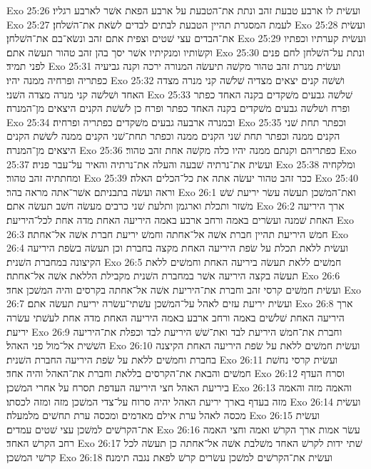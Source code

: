 Exo 25:26  ועשׂית לו ארבע טבעת זהב ונתת את־הטבעת על ארבע הפאת אשׁר לארבע רגליו׃
Exo 25:27  לעמת המסגרת תהיין הטבעת לבתים לבדים לשׂאת את־השׁלחן׃
Exo 25:28  ועשׂית את־הבדים עצי שׁטים וצפית אתם זהב ונשׂא־בם את־השׁלחן׃
Exo 25:29  ועשׂית קערתיו וכפתיו וקשׂותיו ומנקיתיו אשׁר יסך בהן זהב טהור תעשׂה אתם׃
Exo 25:30  ונתת על־השׁלחן לחם פנים לפני תמיד׃
Exo 25:31  ועשׂית מנרת זהב טהור מקשׁה תיעשׂה המנורה ירכה וקנה גביעיה כפתריה ופרחיה ממנה יהיו׃
Exo 25:32  ושׁשׁה קנים יצאים מצדיה שׁלשׁה קני מנרה מצדה האחד ושׁלשׁה קני מנרה מצדה השׁני׃
Exo 25:33  שׁלשׁה גבעים משׁקדים בקנה האחד כפתר ופרח ושׁלשׁה גבעים משׁקדים בקנה האחד כפתר ופרח כן לשׁשׁת הקנים היצאים מן־המנרה׃
Exo 25:34  ובמנרה ארבעה גבעים משׁקדים כפתריה ופרחיה׃
Exo 25:35  וכפתר תחת שׁני הקנים ממנה וכפתר תחת שׁני הקנים ממנה וכפתר תחת־שׁני הקנים ממנה לשׁשׁת הקנים היצאים מן־המנרה׃
Exo 25:36  כפתריהם וקנתם ממנה יהיו כלה מקשׁה אחת זהב טהור׃
Exo 25:37  ועשׂית את־נרתיה שׁבעה והעלה את־נרתיה והאיר על־עבר פניה׃
Exo 25:38  ומלקחיה ומחתתיה זהב טהור׃
Exo 25:39  ככר זהב טהור יעשׂה אתה את כל־הכלים האלה׃
Exo 25:40  וראה ועשׂה בתבניתם אשׁר־אתה מראה בהר׃
Exo 26:1  ואת־המשׁכן תעשׂה עשׂר יריעת שׁשׁ משׁזר ותכלת וארגמן ותלעת שׁני כרבים מעשׂה חשׁב תעשׂה אתם׃
Exo 26:2  ארך היריעה האחת שׁמנה ועשׂרים באמה ורחב ארבע באמה היריעה האחת מדה אחת לכל־היריעת׃
Exo 26:3  חמשׁ היריעת תהיין חברת אשׁה אל־אחתה וחמשׁ יריעת חברת אשׁה אל־אחתה׃
Exo 26:4  ועשׂית ללאת תכלת על שׂפת היריעה האחת מקצה בחברת וכן תעשׂה בשׂפת היריעה הקיצונה במחברת השׁנית׃
Exo 26:5  חמשׁים ללאת תעשׂה ביריעה האחת וחמשׁים ללאת תעשׂה בקצה היריעה אשׁר במחברת השׁנית מקבילת הללאת אשׁה אל־אחתה׃
Exo 26:6  ועשׂית חמשׁים קרסי זהב וחברת את־היריעת אשׁה אל־אחתה בקרסים והיה המשׁכן אחד׃
Exo 26:7  ועשׂית יריעת עזים לאהל על־המשׁכן עשׁתי־עשׂרה יריעת תעשׂה אתם׃
Exo 26:8  ארך היריעה האחת שׁלשׁים באמה ורחב ארבע באמה היריעה האחת מדה אחת לעשׁתי עשׂרה יריעת׃
Exo 26:9  וחברת את־חמשׁ היריעת לבד ואת־שׁשׁ היריעת לבד וכפלת את־היריעה השׁשׁית אל־מול פני האהל׃
Exo 26:10  ועשׂית חמשׁים ללאת על שׂפת היריעה האחת הקיצנה בחברת וחמשׁים ללאת על שׂפת היריעה החברת השׁנית׃
Exo 26:11  ועשׂית קרסי נחשׁת חמשׁים והבאת את־הקרסים בללאת וחברת את־האהל והיה אחד׃
Exo 26:12  וסרח העדף ביריעת האהל חצי היריעה העדפת תסרח על אחרי המשׁכן׃
Exo 26:13  והאמה מזה והאמה מזה בעדף בארך יריעת האהל יהיה סרוח על־צדי המשׁכן מזה ומזה לכסתו׃
Exo 26:14  ועשׂית מכסה לאהל ערת אילם מאדמים ומכסה ערת תחשׁים מלמעלה׃
Exo 26:15  ועשׂית את־הקרשׁים למשׁכן עצי שׁטים עמדים׃
Exo 26:16  עשׂר אמות ארך הקרשׁ ואמה וחצי האמה רחב הקרשׁ האחד׃
Exo 26:17  שׁתי ידות לקרשׁ האחד משׁלבת אשׁה אל־אחתה כן תעשׂה לכל קרשׁי המשׁכן׃
Exo 26:18  ועשׂית את־הקרשׁים למשׁכן עשׂרים קרשׁ לפאת נגבה תימנה׃
